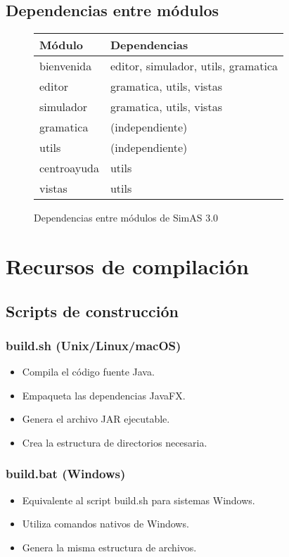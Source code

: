 \subsection{Dependencias entre módulos}

\begin{figure}[H]
\centering
\begin{tabular}{|l|l|}
\hline
\textbf{Módulo} & \textbf{Dependencias} \\
\hline
bienvenida & editor, simulador, utils, gramatica \\
\hline
editor & gramatica, utils, vistas \\
\hline
simulador & gramatica, utils, vistas \\
\hline
gramatica & (independiente) \\
\hline
utils & (independiente) \\
\hline
centroayuda & utils \\
\hline
vistas & utils \\
\hline
\end{tabular}
\caption{Dependencias entre módulos de SimAS 3.0}
\label{fig:dependencias-modulos}
\end{figure}

\section{Recursos de compilación}

\subsection{Scripts de construcción}

\subsubsection{build.sh (Unix/Linux/macOS)}
\begin{itemize}
    \item Compila el código fuente Java.
    \item Empaqueta las dependencias JavaFX.
    \item Genera el archivo JAR ejecutable.
    \item Crea la estructura de directorios necesaria.
\end{itemize}

\subsubsection{build.bat (Windows)}
\begin{itemize}
    \item Equivalente al script build.sh para sistemas Windows.
    \item Utiliza comandos nativos de Windows.
    \item Genera la misma estructura de archivos.
\end{itemize}

